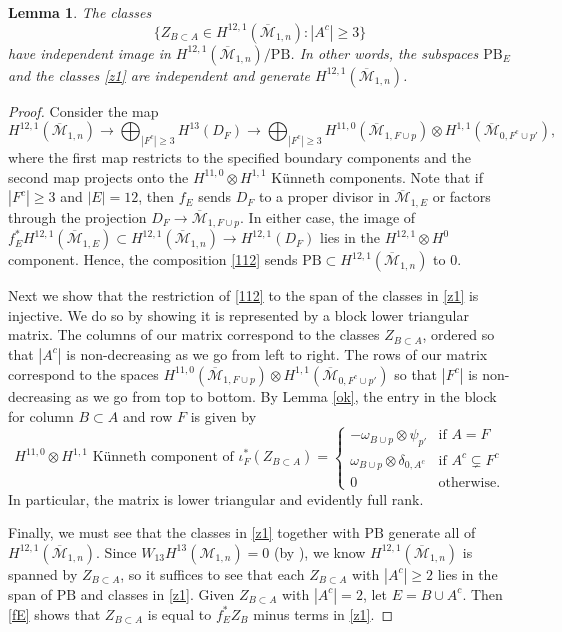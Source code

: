 \documentclass[12pt]{amsart}
\newtheorem{lem}[thm]{Lemma}
\theoremstyle{definition}
\numberwithin{equation}{section}
\newcommand{\M}{\mathcal{M}}
\newcommand{\Mb}{\overline{\M}}
\newcommand{\pb}{\mathrm{PB}}
\theoremstyle{definition} %
\theoremstyle{remark}
\begin{document}
\begin{lem} \label{maing1}
The classes
\begin{equation} \label{z1} \{Z_{B \subset A} \in H^{12,1}(\Mb_{1,n}): |A^c| \geq 3\}
\end{equation}
have independent image in
 $H^{12,1}(\Mb_{1,n})/\pb$. In other words, the subspaces $\pb_E$ and the classes \eqref{z1} are independent and generate $H^{12,1}(\Mb_{1,n})$.
\end{lem}
\begin{proof}
Consider the map
\begin{equation} \label{112}
H^{12,1}(\Mb_{1,n}) \rightarrow \bigoplus_{|F^c| \geq 3} H^{13}(D_F) \rightarrow \bigoplus_{|F^c| \geq 3} H^{11,0}(\Mb_{1,F \cup p}) \otimes H^{1,1}(\Mb_{0, F^c \cup p'}),
\end{equation}
where the first map restricts to the specified boundary components and the second map projects onto the $H^{11,0} \otimes H^{1,1}$ K\"unneth components. Note that if $|F^c| \geq 3$ and $|E| = 12$, then $f_E$ sends $D_F$ to a proper divisor in $\Mb_{1,E}$ or factors through the projection $D_F \to \Mb_{1,F \cup p}$. In either case, the image of $f_E^*H^{12,1}(\Mb_{1,E}) \subset H^{12,1}(\Mb_{1,n}) \to H^{12,1}(D_F)$ lies in the $H^{12,1} \otimes H^0$ component. Hence, the composition \eqref{112} sends $\pb \subset H^{12,1}(\Mb_{1,n})$ to $0$. 


Next we show that the restriction of \eqref{112} to the span of the classes in \eqref{z1} is injective. We do so by showing it is
represented by a block lower triangular matrix.
The columns of our matrix correspond to the classes $Z_{B \subset A}$, ordered so that $|A^c|$ is non-decreasing as we go from left to right. The rows of our matrix correspond to the spaces $H^{11,0}(\Mb_{1, F \cup p}) \otimes H^{1,1}(\Mb_{0, F^c \cup p'})$ so that $|F^c|$ is non-decreasing as we go from top to bottom.
By Lemma \ref{ok}, the entry in the block for column $B \subset A$ and row $F$ is given by
\[\text{$H^{11,0} \otimes H^{1,1}$ K\"unneth component of }\iota_{F}^*(Z_{B \subset A}) =\begin{cases} -\omega_{B \cup p} \otimes \psi_{p'} & \text{if $A = F$} \\
\omega_{B \cup p} \otimes \delta_{0,A^c} & \text{if $A^c \subsetneq F^c$} \\
 0 & \text{otherwise.}\end{cases} \]
 In particular, the matrix is lower triangular and evidently full rank.

 Finally, we must see that the classes in \eqref{z1} together with $\pb$ generate all of $H^{12,1}(\Mb_{1,n})$. Since $W_{13}H^{13}(\M_{1,n}) = 0$ (by \cite[Proposition 7]{Petersenappendix}), we know $H^{12,1}(\Mb_{1,n})$ is spanned by $Z_{B \subset A}$, so it suffices to see that each $Z_{B \subset A}$ with $|A^c| \geq 2$ lies in the span of $\pb$ and classes in \eqref{z1}. Given $Z_{B \subset A}$ with $|A^c| = 2$, let $E = B \cup A^c$. Then \eqref{fE} shows that $Z_{B \subset A}$ is equal to $f_E^*Z_{B}$ minus terms in \eqref{z1}.
 \end{proof}
\end{document}
